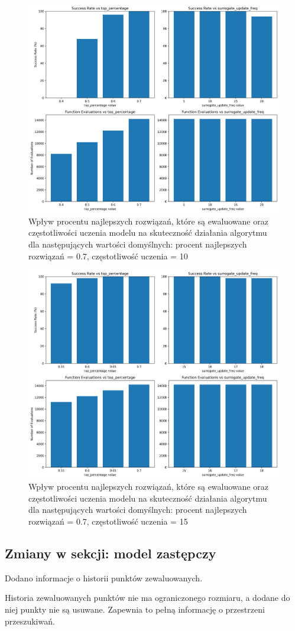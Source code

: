 \documentclass{article}
\begin{document}
\begin{figure}[H]
    \centering
    \includegraphics[width=\textwidth]{surrogate_de_parameter_tuning_results2.png}
    \caption{Wpływ procentu najlepszych rozwiązań, które są ewaluowane oraz częstotliwości uczenia modelu na skuteczność działania algorytmu dla następujących wartości domyślnych: procent najlepszych rozwiązań = 0.7, częstotliwość uczenia = 10}
    \label{fig:surogate_de_parameter_results2}
\end{figure}

\begin{figure}[H]
    \centering
    \includegraphics[width=\textwidth]{surrogate_de_parameter_tuning_results3.png}
    \caption{Wpływ procentu najlepszych rozwiązań, które są ewaluowane oraz częstotliwości uczenia modelu na skuteczność działania algorytmu dla następujących wartości domyślnych: procent najlepszych rozwiązań = 0.7, częstotliwość uczenia = 15}
    \label{fig:surogate_de_parameter_results3}
\end{figure}


\subsection{Zmiany w sekcji: model zastępczy}

Dodano informacje o historii punktów zewaluowanych.

Historia zewaluowanych punktów nie ma ograniczonego rozmiaru, a dodane do niej punkty nie są usuwane. Zapewnia to pełną informację o przestrzeni przeszukiwań.
\end{document}

